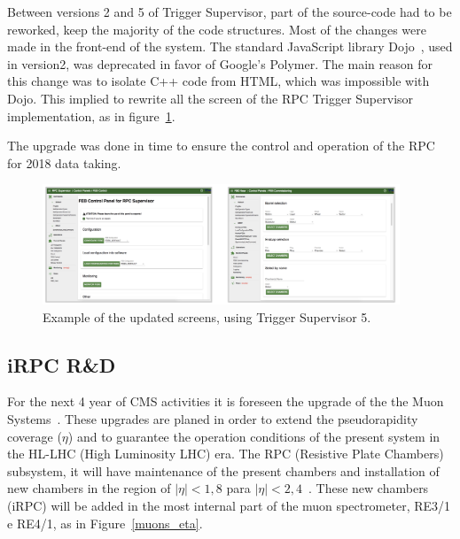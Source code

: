 Between versions 2 and 5 of Trigger Supervisor, part of the source-code had to be reworked, keep the majority of the code structures. Most of the changes were made in the front-end of the system. The standard JavaScript library Dojo~\cite{dojo}, used in version2, was deprecated in favor of Google's Polymer\cite{polymer}. The main reason for this change was to isolate C++ code from HTML, which was impossible with Dojo. This implied to rewrite all the screen of the RPC Trigger Supervisor implementation, as in figure~\ref{ts_view}.

The upgrade  was done in time to ensure the control and operation of the RPC for 2018 data taking.

\begin{figure}[h]
\begin{center}
\includegraphics[width=0.95\textwidth,keepaspectratio]{figures/rpc/ts_view.png}
\end{center}
\caption{Example of the updated screens, using Trigger Supervisor 5.}\label{ts_view}
\end{figure}


\subsection{iRPC R\&D}

For the next 4 year of CMS activities it is foreseen  the upgrade of the the Muon Systems~\cite{muon_tdr}. These upgrades are planed in order to extend the pseudorapidity coverage ($\eta$) and to guarantee the operation conditions of the present system in the HL-LHC (High Luminosity LHC) era. The RPC (Resistive Plate Chambers)~\cite{muon_tdr} subsystem, it will have maintenance of the present chambers and installation of new chambers in the region of $|\eta| < 1,8$ para $|\eta| < 2,4$~\cite{pedrazamorales2018rpc}. These new chambers (iRPC) will be added in the most internal part of the muon spectrometer, RE3/1 e RE4/1, as in Figure~\ref{muons_eta}.

